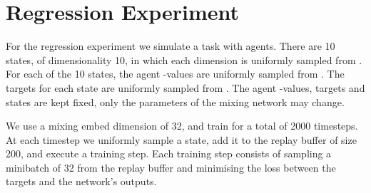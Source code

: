 \documentclass[twoside,11pt]{article}
\begin{document}
 \section{Regression Experiment}
\label{sec:regression_exp}

For the regression experiment we simulate a task with  agents.
There are 10 states, of dimensionality 10, in which each dimension is uniformly sampled from .
For each of the 10 states, the agent -values are uniformly sampled from .
The  targets for each state are uniformly sampled from .
The agent -values, targets and states are kept fixed, only the parameters of the mixing network may change.

We use a mixing embed dimension of 32, and train for a total of 2000 timesteps.
At each timestep we uniformly sample a state, add it to the replay buffer of size 200, and execute a training step.
Each training step consists of sampling a minibatch of 32 from the replay buffer and minimising the  loss between the  targets and the network's outputs. 
\end{document}
